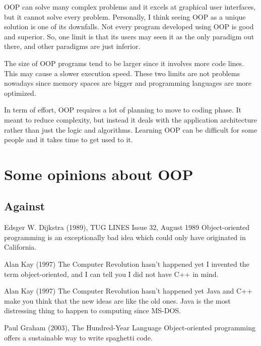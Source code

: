 \documentclass[12pt]{book}
\begin{document}
OOP can solve many complex problems and it excels at graphical user interfaces, but it cannot solve every problem. 
Personally, I think seeing OOP as a unique solution is one of its downfalls. 
Not every program developed using OOP is good and superior. 
So, one limit is that its users may seen it as the only paradigm out there, and other paradigms are just inferior.

The size of OOP programs tend to be larger since it involves more code lines. 
This may cause a slower execution speed. 
These two limits are not problems nowadays since memory spaces are bigger and programming languages are more optimized.

In term of effort, OOP requires a lot of planning to move to coding phase.
It meant to reduce complexity, but instead it deals with the application architecture rather than just the logic and algorithms.
Learning OOP can be difficult for some people and it takes time to get used to it.

\section{Some opinions about OOP}

\subsection{Against}

\begin{kodequote}{Edsger W. Dijkstra (1989), TUG LINES Issue 32, August 1989}
	Object-oriented programming is an exceptionally bad idea which could only have originated in California.
\end{kodequote}

\begin{kodequote}{Alan Kay (1997) The Computer Revolution hasn't happened yet}
	I invented the term object-oriented, and I can tell you I did not have C++ in mind.
\end{kodequote}

\begin{kodequote}{Alan Kay (1997) The Computer Revolution hasn't happened yet}
	Java and C++ make you think that the new ideas are like the old ones. Java is the most distressing thing to happen to computing since MS-DOS.
\end{kodequote}


\begin{kodequote}{Paul Graham (2003), The Hundred-Year Language}
	Object-oriented programming offers a sustainable way to write spaghetti code.
\end{kodequote}
\end{document}
